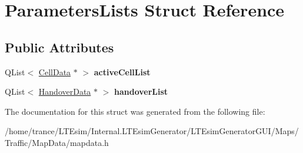 \hypertarget{struct_parameters_lists}{}\section{Parameters\+Lists Struct Reference}
\label{struct_parameters_lists}
\subsection*{Public Attributes}
\begin{DoxyCompactItemize}
\item 
Q\+List$<$ \hyperlink{class_cell_data}{Cell\+Data} $\ast$ $>$ {\bfseries active\+Cell\+List}\hypertarget{struct_parameters_lists_a0637de63ec975714b0096bcf4350b42b}{}\label{struct_parameters_lists_a0637de63ec975714b0096bcf4350b42b}

\item 
Q\+List$<$ \hyperlink{class_handover_data}{Handover\+Data} $\ast$ $>$ {\bfseries handover\+List}\hypertarget{struct_parameters_lists_aaed55dc5d279602de95838ae16dd74f4}{}\label{struct_parameters_lists_aaed55dc5d279602de95838ae16dd74f4}

\end{DoxyCompactItemize}


The documentation for this struct was generated from the following file\+:\begin{DoxyCompactItemize}
\item 
/home/trance/\+L\+T\+Esim/\+Internal.\+L\+T\+Esim\+Generator/\+L\+T\+Esim\+Generator\+G\+U\+I/\+Maps/\+Traffic/\+Map\+Data/mapdata.\+h\end{DoxyCompactItemize}
